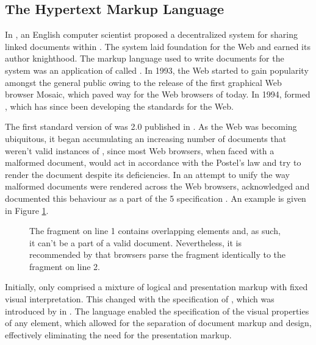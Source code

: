 \documentclass{book}
\begin{document}
\subsection{The Hypertext Markup Language}
In \citeyear{bernerslee89}, an English computer scientist  proposed a decentralized system for sharing linked documents within
 \cite{bernerslee89}. The system laid foundation for the Web
and earned its author knighthood.  The markup language used to write documents
for the system was an application of  called . In
1993, the Web started to gain popularity amongst the general public owing to the
release of the first graphical Web browser Mosaic, which paved way for the Web
browsers of today. In 1994,  formed
, which has since been developing the standards for the Web.

The first standard version of  was  2.0
\cite{bernerslee95} published in \citeyear{bernerslee95}. As the Web was
becoming ubiquitous, it began accumulating an increasing number of documents
that weren't valid instances of , since most Web browsers, when
faced with a malformed document, would act in accordance with the Postel's law
and try to render the document despite its deficiencies. In an attempt to unify
the way malformed  documents were rendered across the Web
browsers,  acknowledged and documented this behaviour as a part of
the 5 specification \cite[sec.\,8.2]{hickson14}. An example is
given in Figure \ref{fig:overlapping-elements}.

\begin{figure}[b]
  \caption{The fragment on line 1 contains overlapping elements and, as such, it
    can't be a part of a valid  document. Nevertheless, it is
    recommended by  that browsers parse the fragment identically to
    the fragment on line 2.}
  \label{fig:overlapping-elements}
\end{figure}

Initially,  only comprised a mixture of logical and presentation
markup with fixed visual interpretation. This changed with the specification of
, which was introduced by  in \citeyear{lie96}. The
language enabled the specification of the visual properties of any element,
which allowed for the separation of document markup and design, effectively
eliminating the need for the presentation markup.
\end{document}
